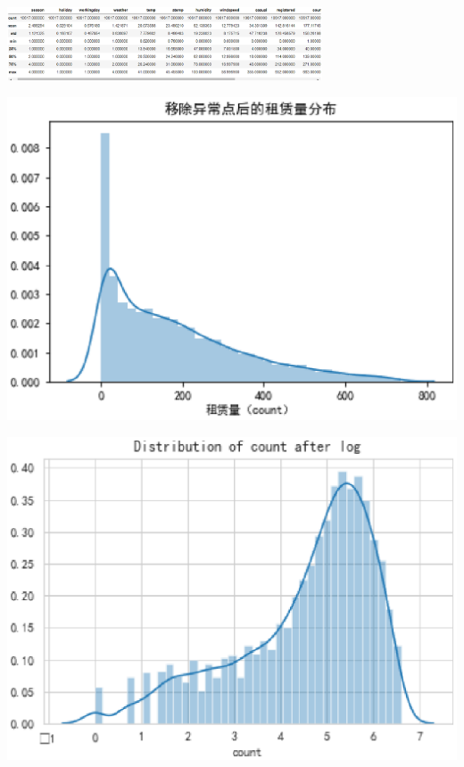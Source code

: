 \begin{center}
  \begin{minipage}{1\linewidth}
    \centering
    \includegraphics[width=0.7\textwidth]{pic/b.eps}
  \end{minipage}
  
  \begin{minipage}{0.4\linewidth}
    \centering
    \includegraphics[height=0.7\textwidth]{pic/count a.eps}
  \end{minipage}
  
  \begin{minipage}{0.4\linewidth}
    \centering
      \includegraphics[height=0.7\textwidth]{pic/log.eps}
  \end{minipage}
  \hfill
\end{center}

